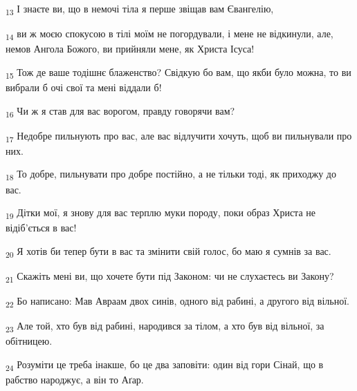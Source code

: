 \begin{tcolorbox}
\textsubscript{13} І знаєте ви, що в немочі тіла я перше звіщав вам Євангелію,
\end{tcolorbox}
\begin{tcolorbox}
\textsubscript{14} ви ж моєю спокусою в тілі моїм не погордували, і мене не відкинули, але, немов Ангола Божого, ви прийняли мене, як Христа Ісуса!
\end{tcolorbox}
\begin{tcolorbox}
\textsubscript{15} Тож де ваше тодішнє блаженство? Свідкую бо вам, що якби було можна, то ви вибрали б очі свої та мені віддали б!
\end{tcolorbox}
\begin{tcolorbox}
\textsubscript{16} Чи ж я став для вас ворогом, правду говорячи вам?
\end{tcolorbox}
\begin{tcolorbox}
\textsubscript{17} Недобре пильнують про вас, але вас відлучити хочуть, щоб ви пильнували про них.
\end{tcolorbox}
\begin{tcolorbox}
\textsubscript{18} То добре, пильнувати про добре постійно, а не тільки тоді, як приходжу до вас.
\end{tcolorbox}
\begin{tcolorbox}
\textsubscript{19} Дітки мої, я знову для вас терплю муки породу, поки образ Христа не відіб'ється в вас!
\end{tcolorbox}
\begin{tcolorbox}
\textsubscript{20} Я хотів би тепер бути в вас та змінити свій голос, бо маю я сумнів за вас.
\end{tcolorbox}
\begin{tcolorbox}
\textsubscript{21} Скажіть мені ви, що хочете бути під Законом: чи не слухаєтесь ви Закону?
\end{tcolorbox}
\begin{tcolorbox}
\textsubscript{22} Бо написано: Мав Авраам двох синів, одного від рабині, а другого від вільної.
\end{tcolorbox}
\begin{tcolorbox}
\textsubscript{23} Але той, хто був від рабині, народився за тілом, а хто був від вільної, за обітницею.
\end{tcolorbox}
\begin{tcolorbox}
\textsubscript{24} Розуміти це треба інакше, бо це два заповіти: один від гори Сінай, що в рабство народжує, а він то Аґар.
\end{tcolorbox}
